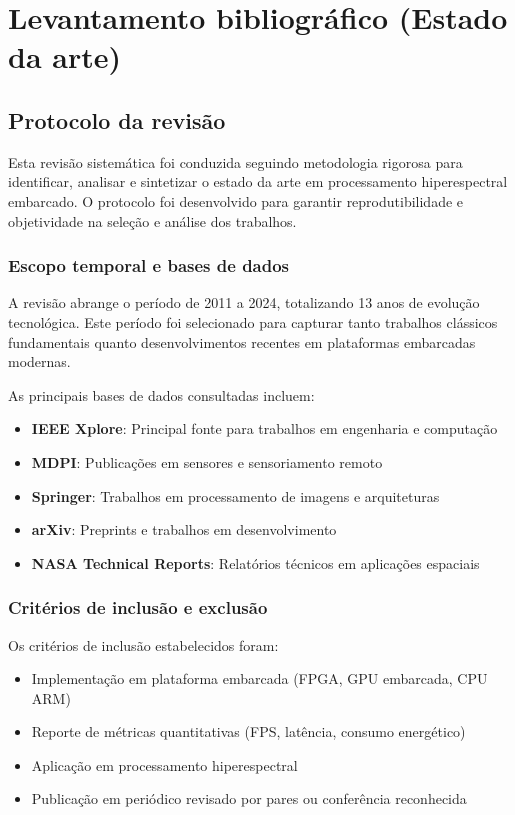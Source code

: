 \chapter{Levantamento bibliográfico (Estado da arte)}\label{chp:levantamento}

\section{Protocolo da revisão}\label{sec:protocolo_revisao}

Esta revisão sistemática foi conduzida seguindo metodologia rigorosa para identificar, analisar e sintetizar o estado da arte em processamento hiperespectral embarcado. O protocolo foi desenvolvido para garantir reprodutibilidade e objetividade na seleção e análise dos trabalhos.

\subsection{Escopo temporal e bases de dados}\label{subsec:escopo_bases}

A revisão abrange o período de 2011 a 2024, totalizando 13 anos de evolução tecnológica. Este período foi selecionado para capturar tanto trabalhos clássicos fundamentais quanto desenvolvimentos recentes em plataformas embarcadas modernas.

As principais bases de dados consultadas incluem:
\begin{itemize}
    \item \textbf{IEEE Xplore}: Principal fonte para trabalhos em engenharia e computação
    \item \textbf{MDPI}: Publicações em sensores e sensoriamento remoto
    \item \textbf{Springer}: Trabalhos em processamento de imagens e arquiteturas
    \item \textbf{arXiv}: Preprints e trabalhos em desenvolvimento
    \item \textbf{NASA Technical Reports}: Relatórios técnicos em aplicações espaciais
\end{itemize}

\subsection{Critérios de inclusão e exclusão}\label{subsec:criterios_selecao}

Os critérios de inclusão estabelecidos foram:
\begin{itemize}
    \item Implementação em plataforma embarcada (FPGA, GPU embarcada, CPU ARM)
    \item Reporte de métricas quantitativas (FPS, latência, consumo energético)
    \item Aplicação em processamento hiperespectral
    \item Publicação em periódico revisado por pares ou conferência reconhecida
\end{itemize}

